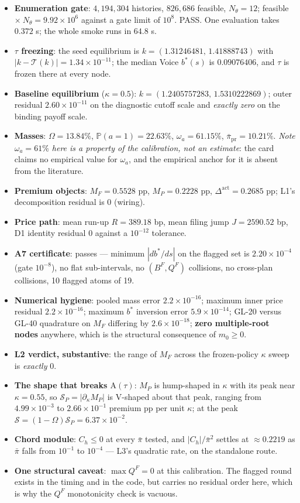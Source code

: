 \documentclass[11pt,a4paper]{article}
\newcommand{\Prb}{\mathbb{P}}
\newcommand{\Dact}{\Delta^{\mathrm{act}}}
\newcommand{\Tmap}{\mathcal{T}}
\newcommand{\Atau}{\mathrm{A}(\tau)}
\begin{document}
\begin{itemize}
\item \textbf{Enumeration gate}: $4{,}194{,}304$ histories, $826{,}686$ feasible,
  $N_\theta=12$; feasible $\times\ N_\theta=9.92\times10^6$ against a gate limit of
  $10^8$. PASS. One evaluation takes $0.372$ s; the whole smoke runs in $64.8$ s.
\item \textbf{$\tau$ freezing}: the seed equilibrium is
  $k=(1.31246481,\,1.41888743)$ with $|k-\Tmap(k)|=1.34\times10^{-11}$; the median
  Voice $b^*(s)$ is $0.09076406$, and $\tau$ is frozen there at every node.
\item \textbf{Baseline equilibrium} ($\kappa=0.5$): $k=(1.2405757283,\,1.5310222869)$;
  outer residual $2.60\times10^{-11}$ on the diagnostic cutoff scale and \emph{exactly
  zero} on the binding payoff scale.
\item \textbf{Masses}: $\Omega=13.84\%$, $\Prb(a=1)=22.63\%$, $\omega_a=61.15\%$,
  $\bar\pi_{\mathrm{pr}}=10.21\%$. \emph{Note $\omega_a=61\%$ here is a property of
  the calibration, not an estimate}: the card claims no empirical value for
  $\omega_a$, and the empirical anchor for it is absent from the literature.
\item \textbf{Premium objects}: $M_F=0.5528$ pp, $M_P=0.2228$ pp,
  $\Dact=0.2685$ pp; L1's decomposition residual is $0$ (wiring).
\item \textbf{Price path}: mean run-up $R=389.18$ bp, mean filing jump
  $J=2590.52$ bp, D1 identity residual $0$ against a $10^{-12}$ tolerance.
\item \textbf{A7 certificate}: passes --- minimum $|db^*/ds|$ on the flagged set is
  $2.20\times10^{-4}$ (gate $10^{-8}$), no flat sub-intervals, no $(B^F,Q^F)$
  collisions, no cross-plan collisions, 10 flagged atoms of 19.
\item \textbf{Numerical hygiene}: pooled mass error $2.2\times10^{-16}$; maximum
  inner price residual $2.2\times10^{-16}$; maximum $b^*$ inversion error
  $5.9\times10^{-14}$; GL-20 versus GL-40 quadrature on $M_F$ differing by
  $2.6\times10^{-18}$; \textbf{zero multiple-root nodes} anywhere, which is the
  structural consequence of $m_0\ge0$.
\item \textbf{L2 verdict, substantive}: the range of $M_F$ across the frozen-policy
  $\kappa$ sweep is \emph{exactly} $0$.
\item \textbf{The shape that breaks $\Atau$}: $M_P$ is hump-shaped in $\kappa$ with
  its peak near $\kappa=0.55$, so $\mathcal S_P=|\partial_\kappa M_P|$ is V-shaped
  about that peak, ranging from $4.99\times10^{-3}$ to $2.66\times10^{-1}$ premium pp
  per unit $\kappa$; at the peak $\mathcal S=(1-\Omega)\mathcal S_P=6.37\times10^{-2}$.
\item \textbf{Chord module}: $C_h\le0$ at every $\bar\pi$ tested, and
  $|C_h|/\bar\pi^2$ settles at $\approx0.2219$ as $\bar\pi$ falls from $10^{-1}$ to
  $10^{-4}$ --- L3's quadratic rate, on the standalone route.
\item \textbf{One structural caveat}: $\max Q^F=0$ at this calibration. The flagged
  round exists in the timing and in the code, but carries no residual order here,
  which is why the $Q^F$ monotonicity check is vacuous.
\end{itemize}
\end{document}
